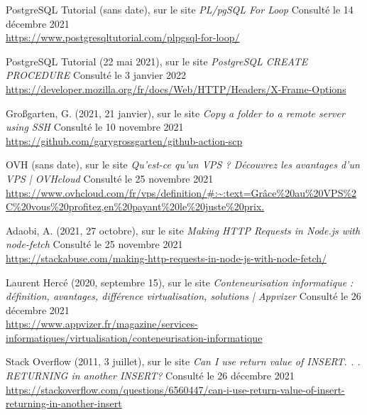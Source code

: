\begin{thebibliography}{}
PostgreSQL Tutorial (sans date), sur le site \textit{PL/pgSQL For Loop} Consulté le 14 décembre 2021
\\\url{https://www.postgresqltutorial.com/plpgsql-for-loop/}

PostgreSQL Tutorial (22 mai 2021), sur le site \textit{PostgreSQL CREATE PROCEDURE} Consulté le 3 janvier 2022
\\\url{https://developer.mozilla.org/fr/docs/Web/HTTP/Headers/X-Frame-Options}

Großgarten, G. (2021, 21 janvier), sur le site \textit{Copy a folder to a remote server using SSH} Consulté le 10 novembre 2021
\\\url{https://github.com/garygrossgarten/github-action-scp}

OVH (sans date), sur le site \textit{Qu'est-ce qu'un VPS ? Découvrez les avantages d'un VPS | OVHcloud} Consulté le 25 novembre 2021
\\\url{https://www.ovhcloud.com/fr/vps/definition/#:~:text=Grâce%20au%20VPS%2C%20vous%20profitez,en%20payant%20le%20juste%20prix.}

Adaobi, A. (2021, 27 octobre), sur le site \textit{Making HTTP Requests in Node.js with node-fetch} Consulté le 25 novembre 2021
\\\url{https://stackabuse.com/making-http-requests-in-node-js-with-node-fetch/}

Laurent Hercé (2020, septembre 15), sur le site \textit{Conteneurisation informatique : définition, avantages, différence virtualisation, solutions | Appvizer} Consulté le 26 décembre 2021
\\\url{https://www.appvizer.fr/magazine/services-informatiques/virtualisation/conteneurisation-informatique}

Stack Overflow (2011, 3 juillet), sur le site \textit{Can I use return value of INSERT. . . RETURNING in another INSERT? } Consulté le 26 décembre 2021
\\\url{https://stackoverflow.com/questions/6560447/can-i-use-return-value-of-insert-returning-in-another-insert}




\end{thebibliography}


